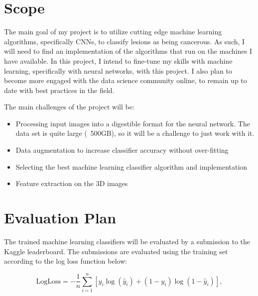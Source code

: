 \documentclass[conference,11pt]{IEEEtran}
\begin{document}
\section{Scope}

The main goal of my project is to utilize cutting edge machine learning algorithms, specifically CNNs, to classify lesions as being cancerous. As such, I will need to find an implementation of the algorithms that run on the machines I have available. In this project, I intend to fine-tune my skills with machine learning, specifically with neural networks, with this project. I also plan to become more engaged with the data science community online, to remain up to date with best practices in the field.

The main challenges of the project will be:
\begin{itemize}
  \item Processing input images into a digestible format for the neural network. The data set is quite large (~500GB), so it will be a challenge to just work with it.
  \item Data augmentation to increase classifier accuracy without over-fitting
  \item Selecting the best machine learning classifier algorithm and implementation
  \item Feature extraction on the 3D images
\end{itemize}

\section{Evaluation Plan}
The trained machine learning classifiers will be evaluated by a submission to the Kaggle leaderboard. The submissions are evaluated using the training set according to the log loss function below:

$$ \textrm{LogLoss} = - \frac{1}{n} \sum_{i=1}^n \left[ y_i \log(\hat{y}_i) + (1 - y_i) \log(1 - \hat{y}_i)\right], $$




\end{document}
